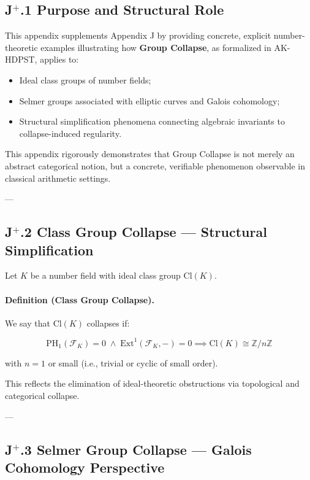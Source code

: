 \documentclass[11pt]{article}
\begin{document}
\subsection*{J$^{+}$.1 Purpose and Structural Role}

This appendix supplements Appendix J by providing concrete, explicit number-theoretic examples illustrating how \textbf{Group Collapse}, as formalized in AK-HDPST, applies to:

\begin{itemize}
    \item Ideal class groups of number fields;
    \item Selmer groups associated with elliptic curves and Galois cohomology;
    \item Structural simplification phenomena connecting algebraic invariants to collapse-induced regularity.
\end{itemize}

This appendix rigorously demonstrates that Group Collapse is not merely an abstract categorical notion, but a concrete, verifiable phenomenon observable in classical arithmetic settings.

---

\subsection*{J$^{+}$.2 Class Group Collapse — Structural Simplification}

Let $K$ be a number field with ideal class group $\mathrm{Cl}(K)$.

\paragraph{Definition (Class Group Collapse).}

We say that $\mathrm{Cl}(K)$ collapses if:

\[
\mathrm{PH}_1(\mathcal{F}_K) = 0 \;\land\; \mathrm{Ext}^1(\mathcal{F}_K, -) = 0 \implies \mathrm{Cl}(K) \cong \mathbb{Z}/n\mathbb{Z}
\]

with $n = 1$ or small (i.e., trivial or cyclic of small order).

This reflects the elimination of ideal-theoretic obstructions via topological and categorical collapse.

---

\subsection*{J$^{+}$.3 Selmer Group Collapse — Galois Cohomology Perspective}
\end{document}
